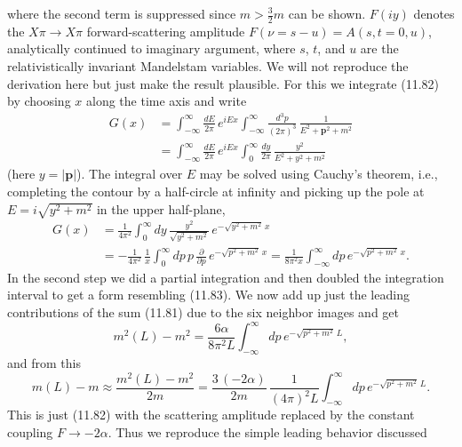 where the second term is suppressed since $m > \tfrac{3}{2}m$ can be shown. $F(iy)$
denotes the $X\pi \to X\pi$ forward-scattering amplitude $F(\nu = s - u) = A(s, t =
0, u)$, analytically continued to imaginary argument, where $s$, $t$, and $u$ are the
relativistically invariant Mandelstam variables.
We will not reproduce the derivation here but just make the result plausible. For this we integrate (11.82) by choosing $x$ along the time axis and write
\begin{equation}
\begin{aligned}
G(x) &= \int_{-\infty}^{\infty} \frac{dE}{2\pi}\, e^{iEx}
\int_{-\infty}^{\infty} \frac{d^3p}{(2\pi)^3}\, \frac{1}{E^2 + \mathbf{p}^2 + m^2} \\
&= \int_{-\infty}^{\infty} \frac{dE}{2\pi}\, e^{iEx}
\int_0^{\infty} \frac{dy}{2\pi}\, \frac{y^2}{E^2 + y^2 + m^2}
\end{aligned}
\end{equation}
(here $y = |\mathbf{p}|$). The integral over $E$ may be solved using Cauchy's theorem,
i.e., completing the contour by a half-circle at infinity and picking up the pole
at $E = i\sqrt{y^2 + m^2}$ in the upper half-plane,
\begin{equation}
\begin{aligned}
G(x) &= \frac{1}{4\pi^2} \int_0^{\infty} dy\,
\frac{y^2}{\sqrt{y^2 + m^2}}\, e^{-\sqrt{y^2 + m^2}\, x} \\
&= -\frac{1}{4\pi^2}\,\frac{1}{x} \int_0^{\infty} dp\, p\,
\frac{\partial}{\partial p}\, e^{-\sqrt{p^2 + m^2}\, x}
= \frac{1}{8\pi^2 x} \int_{-\infty}^{\infty} dp\, e^{-\sqrt{p^2 + m^2}\, x} .
\end{aligned}
\end{equation}
In the second step we did a partial integration and then doubled the integration interval to get a form resembling (11.83). We now add up just the leading
contributions of the sum (11.81) due to the six neighbor images and get
\begin{equation}
m^2(L) - m^2 = \frac{6\alpha}{8\pi^2 L}
\int_{-\infty}^{\infty} dp\, e^{-\sqrt{p^2 + m^2}\, L} ,
\end{equation}
and from this
\begin{equation}
m(L) - m \approx \frac{m^2(L) - m^2}{2m}
= \frac{3\,(-2\alpha)}{2m}\,
\frac{1}{(4\pi)^2 L}
\int_{-\infty}^{\infty} dp\, e^{-\sqrt{p^2 + m^2}\, L} .
\end{equation}
This is just (11.82) with the scattering amplitude replaced by the constant
coupling $F \to -2\alpha$. Thus we reproduce the simple leading behavior discussed

